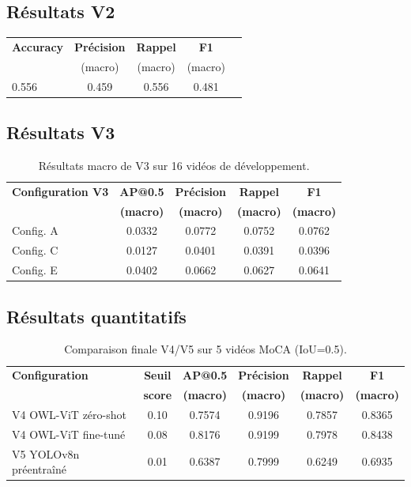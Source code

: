\documentclass{article}
\begin{document}
\subsection{Résultats V2}

\begin{table}[h]
\centering
\begin{tabular}{lcccc}
\hline
\textbf{Accuracy} & \textbf{Précision} & \textbf{Rappel} & \textbf{F1} \\
& (macro) & (macro)& (macro)\\
\hline
0.556 & 0.459 & 0.556 & 0.481 \\
\hline
\end{tabular}
\end{table}

\subsection{Résultats V3}
\begin{table}[H]
\centering
\begin{tabular}{lcccc}
\hline
\textbf{Configuration V3} & \textbf{AP@0.5} & \textbf{Précision} & \textbf{Rappel} & \textbf{F1} \\
 & \textbf{(macro)} & \textbf{(macro)} & \textbf{(macro)} & \textbf{(macro)} \\
\hline
Config. A & 0.0332 & 0.0772 & 0.0752 & 0.0762 \\
Config. C & 0.0127 & 0.0401 & 0.0391 & 0.0396 \\
Config. E & 0.0402 & 0.0662 & 0.0627 & 0.0641 \\
\hline
\end{tabular}
\caption{Résultats macro de V3 sur 16 vidéos de développement.}
\label{tab:v3_results_final}
\end{table}

\subsection{Résultats quantitatifs}
\begin{table}[H]
\centering
\begin{tabular}{lccccc}
\hline
\textbf{Configuration} & \textbf{Seuil} & \textbf{AP@0.5} & \textbf{Précision} & \textbf{Rappel} & \textbf{F1} \\
& \textbf{score} & \textbf{(macro)} & \textbf{(macro)} & \textbf{(macro)} & \textbf{(macro)} \\
\hline
V4 OWL-ViT zéro-shot & 0.10 & 0.7574 & 0.9196 & 0.7857 & 0.8365 \\
V4 OWL-ViT fine-tuné & 0.08 & 0.8176 & 0.9199 & 0.7978 & 0.8438 \\
V5 YOLOv8n préentraîné & 0.01 & 0.6387 & 0.7999 & 0.6249 & 0.6935 \\
\hline
\end{tabular}
\caption{Comparaison finale V4/V5 sur 5 vidéos MoCA (IoU=0.5).}
\label{tab:final_v4_v5}
\end{table}
\end{document}
